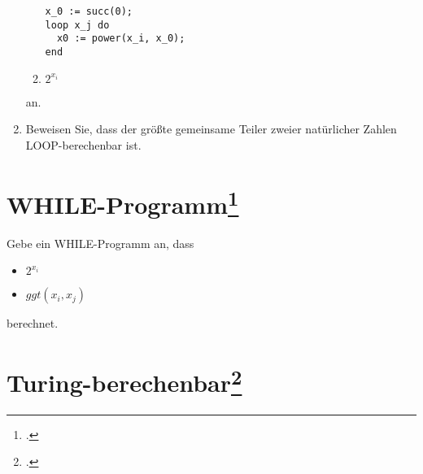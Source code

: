 \documentclass{lehramt-informatik-aufgabe}
\begin{document}
\begin{enumerate}
\begin{enumerate}
\begin{liAntwort}
\begin{verbatim}
x_0 := succ(0);
loop x_j do
  x0 := power(x_i, x_0);
end
\end{verbatim}
\end{liAntwort}

\item $2^{x_i}$
\end{enumerate}

an.

\item Beweisen Sie, dass der größte gemeinsame Teiler zweier natürlicher
Zahlen LOOP-berechenbar ist.

\end{enumerate}

%

\section{WHILE-Programm\footcite[Seite 16]{theo:fs:4}}

Gebe ein WHILE-Programm an, dass

\begin{itemize}
\item $2^{x_i}$
\item $ggt(x_i, x_j)$
\end{itemize}

berechnet.

%

\section{Turing-berechenbar\footcite[Seite 29]{theo:fs:4}}
\end{document}
